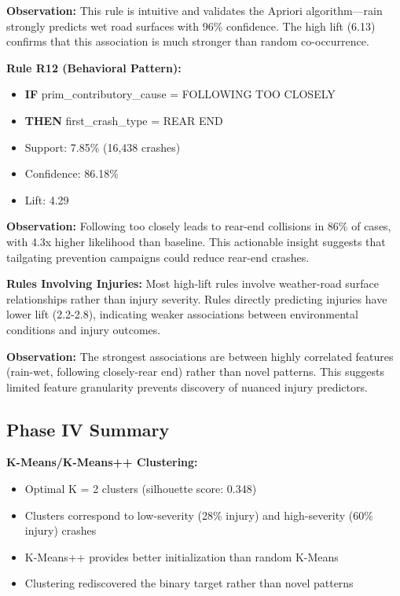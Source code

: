 \documentclass[12pt,man]{apa7}
\begin{document}
\textbf{Observation:} This rule is intuitive and validates the Apriori algorithm—rain strongly predicts wet road surfaces with 96\% confidence. The high lift (6.13) confirms that this association is much stronger than random co-occurrence.

\textbf{Rule R12 (Behavioral Pattern):}
\begin{itemize}
    \item \textbf{IF} prim\_contributory\_cause = FOLLOWING TOO CLOSELY
    \item \textbf{THEN} first\_crash\_type = REAR END
    \item Support: 7.85\% (16,438 crashes)
    \item Confidence: 86.18\%
    \item Lift: 4.29
\end{itemize}

\textbf{Observation:} Following too closely leads to rear-end collisions in 86\% of cases, with 4.3x higher likelihood than baseline. This actionable insight suggests that tailgating prevention campaigns could reduce rear-end crashes.

\textbf{Rules Involving Injuries:}
Most high-lift rules involve weather-road surface relationships rather than injury severity. Rules directly predicting injuries have lower lift (2.2-2.8), indicating weaker associations between environmental conditions and injury outcomes.

\textbf{Observation:} The strongest associations are between highly correlated features (rain-wet, following closely-rear end) rather than novel patterns. This suggests limited feature granularity prevents discovery of nuanced injury predictors.

\subsection{Phase IV Summary}

\textbf{K-Means/K-Means++ Clustering:}
\begin{itemize}
    \item Optimal K = 2 clusters (silhouette score: 0.348)
    \item Clusters correspond to low-severity (28\% injury) and high-severity (60\% injury) crashes
    \item K-Means++ provides better initialization than random K-Means
    \item Clustering rediscovered the binary target rather than novel patterns
\end{itemize}
\end{document}

